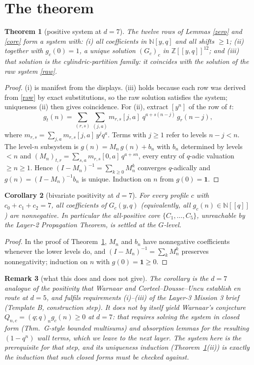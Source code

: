 \documentclass[11pt]{article}
\newtheorem{theorem}{Theorem}
\newtheorem{corollary}[theorem]{Corollary}
\newtheorem{remark}[theorem]{Remark}
\newcommand{\NN}{\mathbb{N}}
\newcommand{\ZZ}{\mathbb{Z}}
\begin{document}
\section{The theorem}

\begin{theorem}[positive system at $d=7$]\label{system}
The twelve rows of Lemmas \ref{zero} and \ref{core} form a system with:
(i) all coefficients in $\NN[y,q]$ and all shifts $\ge1$;
(ii) together with $g_c(0)=1$, a unique solution
$(G_c)_{c}$ in $\ZZ[[y,q]]^{12}$; and
(iii) that solution is the cylindric-partition family: it coincides with the
solution of the raw system \eqref{raw}.
\end{theorem}

\begin{proof}
(i) is manifest from the displays. (iii) holds because each row was derived from
\eqref{raw} by exact substitutions, so the raw solution satisfies the system;
uniqueness (ii) then gives coincidence. For (ii), extract $[y^{n}]$ of the row of
$t$:
\[
g_t(n)=\sum_{(r,s)}\sum_{(j,a)} m_{r,s}[j,a]\;q^{a+s(n-j)}\,g_r(n-j),
\]
where $m_{r,s}=\sum_{j,a}m_{r,s}[j,a]\,y^{j}q^{a}$. Terms with $j\ge1$ refer to
levels $n-j<n$. The level-$n$ subsystem is $g(n)=M_n\,g(n)+b_n$ with
$b_n$ determined by levels $<n$ and $(M_n)_{t,r}=\sum_{s,a}m_{r,s}[0,a]\,q^{a+sn}$,
every entry of $q$-adic valuation $\ge n\ge1$. Hence
$(I-M_n)^{-1}=\sum_{k\ge0}M_n^{k}$ converges $q$-adically and
$g(n)=(I-M_n)^{-1}b_n$ is unique. Induction on $n$ from $g(0)=\mathbf 1$.
\end{proof}

\begin{corollary}[bivariate positivity at $d=7$]\label{pos}
For every profile $c$ with $c_0+c_1+c_2=7$, all coefficients of $G_c(y,q)$
(equivalently, all $g_c(n)\in\NN[[q]]$) are nonnegative. In particular the
all-positive core $\{C_1,\dots,C_5\}$, unreachable by the Layer-2 Propagation
Theorem, is settled at the $G$-level.
\end{corollary}

\begin{proof}
In the proof of Theorem~\ref{system}, $M_n$ and $b_n$ have nonnegative
coefficients whenever the lower levels do, and
$(I-M_n)^{-1}=\sum_k M_n^{k}$ preserves nonnegativity; induction on $n$ with
$g(0)=\mathbf 1\ge0$.
\end{proof}

\begin{remark}[what this does and does not give]
The corollary is the $d=7$ analogue of the positivity that Warnaar and
Corteel--Dousse--Uncu establish en route at $d=5$, and fulfils requirements
(i)--(iii) of the Layer-3 Mission 3 brief (Template B, construction step). It does
\emph{not} by itself yield Warnaar's conjecture $Q_{n,c}=(q;q)_n g_c(n)\ge0$ at
$d=7$: that requires solving the system in closed form (Thm.\ G-style bounded
multisums) and absorption lemmas for the resulting $(1-q^{n})$ wall terms, which
we leave to the next layer. The system here is the prerequisite for that step, and
its uniqueness induction (Theorem~\ref{system}(ii)) is exactly the induction that
such closed forms must be checked against.
\end{remark}
\end{document}

